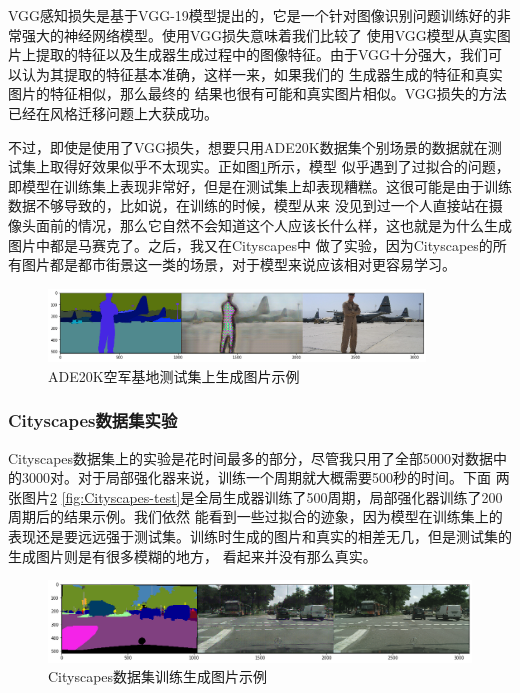 \documentclass[supercite]{HustGraduPaper}
\theoremstyle{definition}
\begin{document}
VGG感知损失是基于VGG-19模型\cite{articleVGG}提出的，它是一个针对图像识别问题训练好的非常强大的神经网络模型。使用VGG损失意味着我们比较了
使用VGG模型从真实图片上提取的特征以及生成器生成过程中的图像特征。由于VGG十分强大，我们可以认为其提取的特征基本准确，这样一来，如果我们的
生成器生成的特征和真实图片的特征相似，那么最终的
结果也很有可能和真实图片相似。VGG损失的方法已经在风格迁移\cite{DBLP:journals/corr/JohnsonAL16}问题上大获成功。

不过，即使是使用了VGG损失，想要只用ADE20K数据集个别场景的数据就在测试集上取得好效果似乎不太现实。正如图\ref{fig:ADE20K-test}所示，模型
似乎遇到了过拟合的问题，即模型在训练集上表现非常好，但是在测试集上却表现糟糕。这很可能是由于训练数据不够导致的，比如说，在训练的时候，模型从来
没见到过一个人直接站在摄像头面前的情况，那么它自然不会知道这个人应该长什么样，这也就是为什么生成图片中都是马赛克了。之后，我又在Cityscapes中
做了实验，因为Cityscapes的所有图片都是都市街景这一类的场景，对于模型来说应该相对更容易学习。
\begin{figure}[H]
  \begin{center}
  \includegraphics[width=10cm]{images/ade20k-test}
  \end{center}
  \caption{ADE20K空军基地测试集上生成图片示例}
  \label{fig:ADE20K-test}
\end{figure}

\subsubsection{Cityscapes数据集实验}

Cityscapes数据集上的实验是花时间最多的部分，尽管我只用了全部5000对数据中的3000对。对于局部强化器来说，训练一个周期就大概需要500秒的时间。下面
两张图片\ref{fig:Cityscapes-train} \ref{fig:Cityscapes-test}是全局生成器训练了500周期，局部强化器训练了200周期后的结果示例。我们依然
能看到一些过拟合的迹象，因为模型在训练集上的表现还是要远远强于测试集。训练时生成的图片和真实的相差无几，但是测试集的生成图片则是有很多模糊的地方，
看起来并没有那么真实。
\begin{figure}[H]
  \begin{center}
  \includegraphics[width=14cm]{images/cityscapes-train}
  \end{center}
  \caption{Cityscapes数据集训练生成图片示例}
  \label{fig:Cityscapes-train}
\end{figure}
\end{document}
